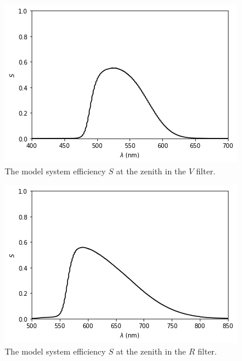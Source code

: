 \begin{figure}
\begin{center}
\includegraphics[width=0.9\linewidth]{figures/huitzi-S-JC-V.png}
\medskip
\caption{The model system efficiency $S$ at the zenith in the $V$ filter.}
\end{center}
\end{figure}

\begin{figure}
\begin{center}
\includegraphics[width=0.9\linewidth]{figures/huitzi-S-JC-R.png}
\medskip
\caption{The model system efficiency $S$ at the zenith in the $R$ filter.}
\end{center}
\end{figure}

